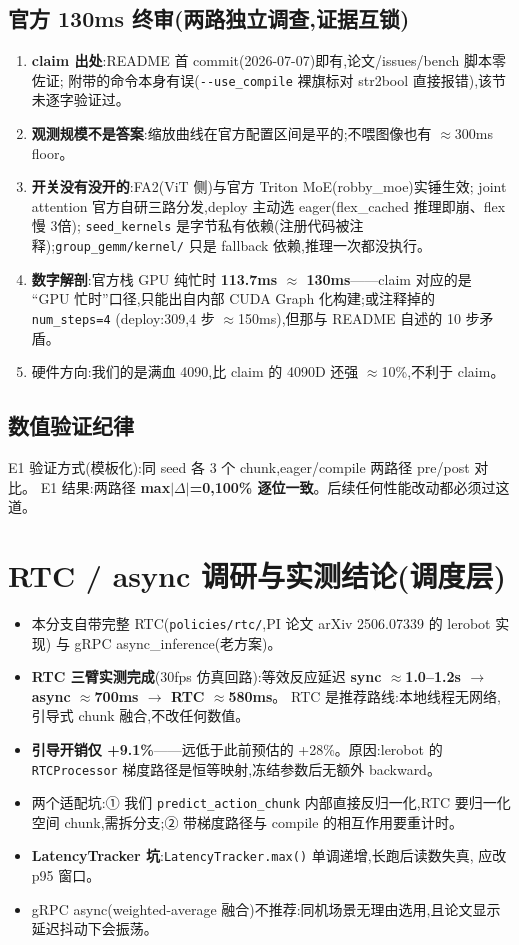 \documentclass[11pt]{ctexart}
\begin{document}
\subsection{官方 130ms 终审(两路独立调查,证据互锁)}
\begin{enumerate}
\item \textbf{claim 出处}:README 首 commit(2026-07-07)即有,论文/issues/bench 脚本零佐证;
附带的命令本身有误(\texttt{-{}-use\_compile} 裸旗标对 str2bool 直接报错),该节未逐字验证过。
\item \textbf{观测规模不是答案}:缩放曲线在官方配置区间是平的;不喂图像也有 $\approx$300ms floor。
\item \textbf{开关没有没开的}:FA2(ViT 侧)与官方 Triton MoE(robby\_moe)实锤生效;
joint attention 官方自研三路分发,deploy 主动选 eager(flex\_cached 推理即崩、flex 慢 3倍);
\texttt{seed\_kernels} 是字节私有依赖(注册代码被注释);\texttt{group\_gemm/kernel/} 只是
fallback 依赖,推理一次都没执行。
\item \textbf{数字解剖}:官方栈 GPU 纯忙时 \textbf{113.7ms $\approx$ 130ms}——claim 对应的是
``GPU 忙时''口径,只能出自内部 CUDA Graph 化构建;或注释掉的 \texttt{num\_steps=4}
(deploy:309,4 步 $\approx$150ms),但那与 README 自述的 10 步矛盾。
\item 硬件方向:我们的是满血 4090,比 claim 的 4090D 还强 $\approx$10\%,不利于 claim。
\end{enumerate}

\subsection{数值验证纪律}
E1 验证方式(模板化):同 seed 各 3 个 chunk,eager/compile 两路径 pre/post 对比。
E1 结果:两路径 \textbf{max$|\Delta|$=0,100\% 逐位一致}。后续任何性能改动都必须过这道。

\section{RTC / async 调研与实测结论(调度层)}
\begin{itemize}
\item 本分支自带完整 RTC(\texttt{policies/rtc/},PI 论文 arXiv 2506.07339 的 lerobot 实现)
与 gRPC async\_inference(老方案)。
\item \textbf{RTC 三臂实测完成}(30fps 仿真回路):等效反应延迟
\textbf{sync $\approx$1.0--1.2s $\to$ async $\approx$700ms $\to$ RTC $\approx$580ms}。
RTC 是推荐路线:本地线程无网络,引导式 chunk 融合,不改任何数值。
\item \textbf{引导开销仅 +9.1\%}——远低于此前预估的 +28\%。原因:lerobot 的
\texttt{RTCProcessor} 梯度路径是恒等映射,冻结参数后无额外 backward。
\item 两个适配坑:① 我们 \texttt{predict\_action\_chunk} 内部直接反归一化,RTC 要归一化空间
chunk,需拆分支;② 带梯度路径与 compile 的相互作用要重计时。
\item \textbf{LatencyTracker 坑}:\texttt{LatencyTracker.max()} 单调递增,长跑后读数失真,
应改 p95 窗口。
\item gRPC async(weighted-average 融合)不推荐:同机场景无理由选用,且论文显示延迟抖动下会振荡。
\end{itemize}
\end{document}
